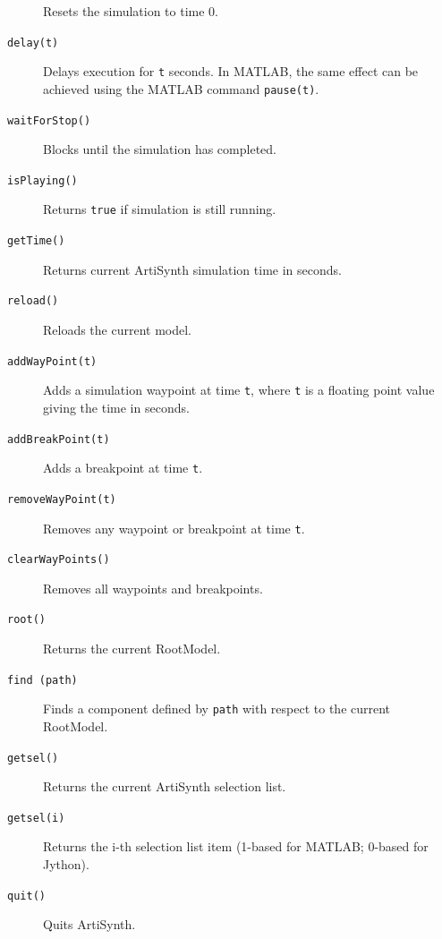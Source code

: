\documentclass{article}
\begin{document}
\begin{description}
Resets the simulation to time 0.

\item[{\tt delay(t)} ] \mbox{}

Delays execution for {\tt t} seconds. In MATLAB, the same effect can
be achieved using the MATLAB command {\tt pause(t)}.

\item[{\tt waitForStop()} ] \mbox{}

Blocks until the simulation has completed.

\item[{\tt isPlaying()} ] \mbox{}

Returns {\tt true} if simulation is still running.

\item[{\tt getTime()} ] \mbox{}

Returns current ArtiSynth simulation time in seconds.

\item[{\tt reload()} ] \mbox{}

Reloads the current model.

\item[{\tt addWayPoint(t)} ] \mbox{}

Adds a simulation waypoint at time {\tt t},
where {\tt t} is a floating point value giving
the time in seconds.

\item[{\tt addBreakPoint(t)} ] \mbox{}

Adds a breakpoint at time {\tt t}.

\item[{\tt removeWayPoint(t)} ] \mbox{}

Removes any waypoint or breakpoint at time {\tt t}.

\item[{\tt clearWayPoints()} ] \mbox{}

Removes all waypoints and breakpoints.

\item[{\tt root()} ] \mbox{}

Returns the current RootModel.

\item[{\tt find (path)} ] \mbox{}

Finds a component defined by {\tt path} with respect to the current RootModel.

\item[{\tt getsel()} ] \mbox{}

Returns the current ArtiSynth selection list.

\item[{\tt getsel(i)} ] \mbox{}

Returns the i-th selection list item (1-based for MATLAB; 0-based for Jython).

\item[{\tt quit()} ] \mbox{}

Quits ArtiSynth.

\end{description}
\end{document}
